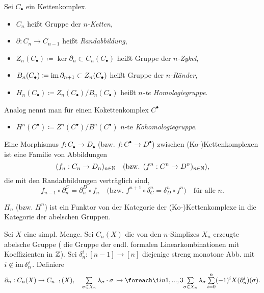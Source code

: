 \documentclass{cheat-sheet}
\newcommand{\nspace}[1]{\foreach \i in {1,...,#1}{ \! }} %
\newcommand{\CC}[1]{{#1}_{\bullet}} %
\newcommand{\CCC}[1]{{#1}^{\bullet}} %
\begin{document}
\begin{defn}
  Sei $\CC{C}$ ein Kettenkomplex.
  \begin{itemize}
    \item $C_n$ heißt Gruppe der \emph{$n$-Ketten},
    \item $\partial : C_n \to C_{n-1}$ heißt \emph{Randabbildung},
    \item $Z_n(\CC{C}) \coloneqq \ker \partial_n \subset C_n(\CC{C})$ heißt Gruppe der \emph{$n$-Zykel},
    \item $B_n(\CC{C}) \coloneqq \im \partial_{n+1} \subset Z_n(\CC{C})$ heißt Gruppe der \emph{$n$-Ränder},
    \item $H_n(\CC{C}) \coloneqq Z_n(\CC{C}) / B_n(\CC{C})$ heißt \emph{$n$-te Homologiegruppe}.
  \end{itemize}
  Analog nennt man für einen Kokettenkomplex $\CCC{C}$
  \begin{itemize}
    \item $H^n(\CCC{C}) \coloneqq Z^n(\CCC{C}) / B^n(\CCC{C})$ $n$-te \emph{Kohomologiegruppe}.
  \end{itemize}
\end{defn}

\begin{defn}
  Eine Morphismus $f : \CC{C} \to \CC{D}$ (bzw. $f : \CCC{C} \to \CCC{D}$) zwischen (Ko-)Kettenkomplexen ist eine Familie von Abbildungen
  \[
    (f_n : C_n \to D_n)_{n \in \mathbb{N}} \quad
    \text{(bzw. $(f^n : C^n \to D^n)_{n \in \mathbb{N}}$),}
  \]
  die mit den Randabbildungen verträglich sind, \dh{}
  \[
    f_{n-1} \circ \partial^C_n = \partial^D_n \circ f_n \quad
    \text{(bzw. $f^{n+1} \circ \delta_C^n = \delta_D^n \circ f^n$)} \quad
    \text{für alle $n$.}
  \]
\end{defn}

\begin{prop}
  $H_n$ (bzw. $H^n$) ist ein Funktor von der Kategorie der (Ko-)Kettenkomplexe in die Kategorie der abelschen Gruppen.
\end{prop}

\begin{defn}
  Sei $X$ eine simpl. Menge. Sei $C_n(X)$ die von den $n$-Simplizes $X_n$ erzeugte abelsche Gruppe (\dh{} die Gruppe der endl. formalen Linearkombinationen mit Koeffizienten in $\mathbb{Z}$). Sei $\delta_n^i : [n{-}1] \to [n]$ diejenige streng monotone Abb. mit $i \not\in \operatorname{im} \delta_n^i$. Definiere
  \[
    \partial_n : C_n(X) \to C_{n-1}(X), \quad
    \sum_{\sigma \in X_n} \lambda_\sigma \cdot \sigma \, \mapsto \nspace{3} \sum_{\sigma \in X_n} \lambda_\sigma \sum_{i=0}^n (-1)^i X(\partial_n^i)(\sigma).
  \]
\end{defn}
\end{document}
